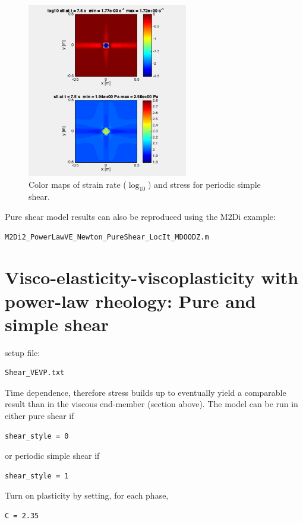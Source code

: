 \documentclass[12pt,english,openany]{scrbook}
\begin{document}
\begin{figure}[ht!]
\centerline{\includegraphics[height=3.0in]{./Figures/SimpleShear_pwl_VE_cmaps}}
\caption{Color maps of strain rate ($\log_{10}$) and stress for periodic simple shear.}
\label{PureShear_pwl_VE_cmaps}
\end{figure}

Pure shear model results can also be reproduced using the M2Di example:
\begin{verbatim} 
M2Di2_PowerLawVE_Newton_PureShear_LocIt_MDOODZ.m
\end{verbatim}

\section{Visco-elasticity-viscoplasticity with power-law rheology: Pure and simple shear}

setup file:
\begin{verbatim} 
Shear_VEVP.txt
\end{verbatim}

Time dependence, therefore stress builds up to eventually yield a comparable result than in the viscous end-member (section above).
The model can be run in either pure shear if 
\begin{verbatim} 
shear_style = 0
\end{verbatim}

or periodic simple shear if 
\begin{verbatim} 
shear_style = 1
\end{verbatim}

Turn on plasticity by setting, for each phase,
\begin{verbatim} 
C = 2.35
\end{verbatim}
\end{document}
